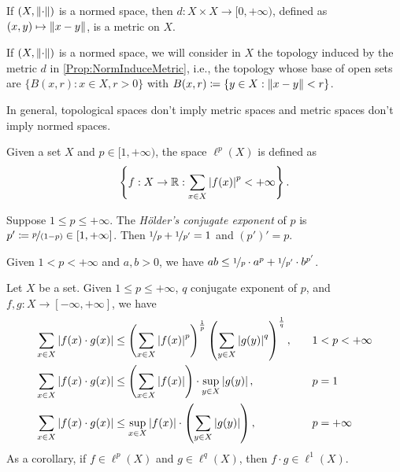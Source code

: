 \documentclass[screen,single]{techreport}
\numberwithin{equation}{section}
\begin{document}
\begin{proposition}\label{Prop:NormInduceMetric}
	If $(X,\left\|{\cdot}\right\|)$ is a normed space, then $d : X \times X \to [0,+\infty)$, defined as $(x,y) \mapsto \left\|{x-y}\right\|$, is a metric on $X$.
\end{proposition}

\begin{remark}\label{Rem:NormedBalls}
	If $(X,\left\|{\cdot}\right\|)$ is a normed space, we will consider in $X$ the topology induced by the metric $d$ in \cref{Prop:NormInduceMetric}, i.e., the topology whose base of open sets are $\{ B(x,r) : x \in X, r > 0 \}$ with $B(x,r) \coloneqq \{ y \in X : \left\|{x-y}\right\| < r \}$.
\end{remark}

\begin{remark}\label{Rem:MetricNotImplyNorm}
	In general, topological spaces don't imply metric spaces and metric spaces don't imply normed spaces.
\end{remark}

\begin{definition}\label{De:lpSpaces}
	Given a set $X$ and $p \in [1,+\infty)$, the space $\ell^p(X)$ is defined as
	\begin{equation*}
		\left\{ { f : X \to \mathbb{R} : \sum_{x \in X} \left|{f(x)}\right|^p < +\infty } \right\}.
	\end{equation*}
\end{definition}

\begin{definition}\label{De:HoldersConjugateExponent}
	Suppose $1 \le p \le +\infty$.
	The \emph{H{\"o}lder's conjugate exponent} of $p$ is $p' \coloneqq \nicefrac{p}{(1-p)} \in [1,+\infty]$.
	Then $\nicefrac{1}{p} + \nicefrac{1}{p'}=1$ and $(p')' = p$.
\end{definition}

\begin{theorem}\label{The:YangsInequality}
	Given $1 < p < +\infty$ and $a,b > 0$, we have $ab \le \nicefrac{1}{p}  \cdot a^p + \nicefrac{1}{p'} \cdot b^{p'}$.
\end{theorem}

\begin{theorem}\label{The:HoldersInequality}
	Let $X$ be a set.
	Given $1 \le p \le +\infty$, $q$ conjugate exponent of $p$, and $f,g: X \to [-\infty,+\infty]$, we have
	\begin{alignat*}{2}
		\sum_{x \in X} \left|{f(x) \cdot g(x)}\right| & \le  \left({ \sum_{x \in X} \left|{f(x)}\right|^p }\right)^{\frac{1}{p}} \left({  \sum_{y \in X} \left|{g(y)}\right|^q }\right)^{\frac{1}{q}}, \quad &&  1 < p < +\infty \\
		\sum_{x \in X} \left|{f(x) \cdot g(x)}\right| & \le \left({ \sum_{x \in X} \left|{f(x)}\right| }\right) \cdot \sup_{y \in X} \left|{g(y)}\right|, \quad &&  p=1 \\
		\sum_{x \in X} \left|{f(x) \cdot g(x)}\right| & \le \sup_{x \in X} \left|{f(x)}\right| \cdot \left({ \sum_{y \in X} \left|{g(y)}\right| }\right), \quad && p=+\infty
	\end{alignat*}
	As a corollary, if $f \in \ell^p(X)$ and $g \in \ell^q(X)$, then $f \cdot g \in \ell^1(X)$.
\end{theorem}
\end{document}
